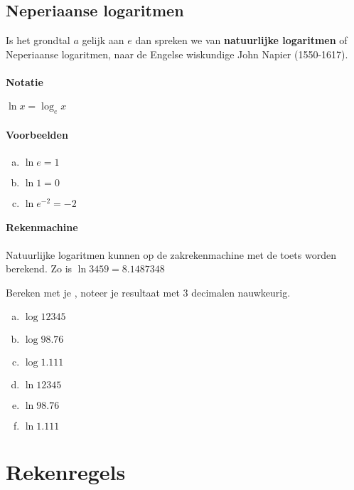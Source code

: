 \documentclass[12pt,twoside]{article}
\begin{document}
\subsection{Neperiaanse logaritmen}

Is het grondtal $a$ gelijk aan $e$ dan spreken we van {\bf natuurlijke logaritmen} of Neperiaanse logaritmen, naar de Engelse wiskundige John Napier (1550-1617).

\paragraph{Notatie} $\ln x = \log_{e} x$

\paragraph{Voorbeelden}\begin{minipage}[t]{\textwidth}
\begin{enumerate}[(a)]
  \item $\ln e = 1$
  \item $\ln 1 = 0$
  \item $\ln e^{-2} = -2$
\end{enumerate}
\end{minipage}

\paragraph{Rekenmachine} Natuurlijke logaritmen kunnen op de zakrekenmachine met de  toets worden berekend.
Zo is $\ln 3459 = 8.1487348$

\begin{oefening}
Bereken met je , noteer je resultaat met 3 decimalen nauwkeurig.
\begin{multicols}{3}
\begin{enumerate}[(a)]
  \item $\log 12345$
  \item $\log 98.76$
  \item $\log 1.111$
  \item $\ln 12345$
  \item $\ln 98.76$
  \item $\ln 1.111$
\end{enumerate}
\end{multicols}
\end{oefening}

\pagebreak

\section{Rekenregels}
\end{document}
